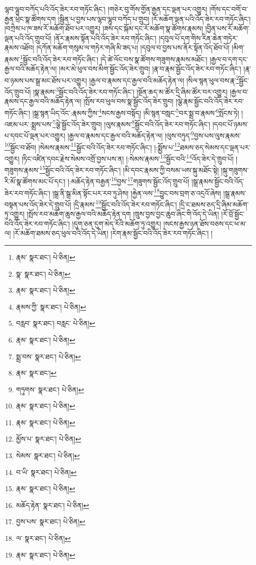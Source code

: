 ལྷབ་ལྷུབ་བཀོད་པའི་འོད་ཟེར་རབ་གཏོང་ཞིང་། །གཅེར་བུ་གོས་གྱོན་རྒྱན་དང་ལྡན་པར་འགྱུར། །གོས་དང་བགོ་བ་རྒྱན་ཕྲེང་སྣ་ཚོགས་དག །སྦྱིན་པ་བྱས་པས་ལྷབ་ལྷུབ་བཀོད་པ་གྲུབ། །རོ་མཆོག་ལྡན་པའི་འོད་ཟེར་རབ་གཏོང་ཞིང་། །བཀྲེས་པ་ཁ་ཟས་རོ་མཆོག་ཐོབ་པར་འགྱུར། །ཟས་དང་སྐོམ་དང་རོ་མཆོག་སྣ་ཚོགས་རྣམས། །བྱིན་པས་རོ་མཆོག་ལྡན་པའི་འོད་གྲུབ་པོ། །ནོར་རྣམས་སྟོན་པའི་འོད་ཟེར་རབ་གཏོང་ཞིང་། །དབུལ་པོ་དག་གིས་རིན་ཆེན་གཏེར་རྣམས་འཐོབ། །དཀོན་མཆོག་གསུམ་ལ་གཏེར་གཞི་མི་ཟད་པ། །དབུལ་བ་བྱས་པས་ནོར་སྟོན་འོད་ཐོབ་པོ། །མིག་རྣམས་\footnote{རྣམ་  སྣར་ཐང་།  པེ་ཅིན། }སྦྱོང་བའི་འོད་ཟེར་རབ་གཏོང་ཞིང་། །དེ་ཚེ་ལོང་བས་སྣ་ཚོགས་གཟུགས་རྣམས་མཐོང་། །རྒྱལ་བ་དག་དང་རྒྱལ་བའི་མཆོད་རྟེན་ལ། །མར་མེ་ཕུལ་བས་མིག་སྦྱོང་འོད་ཟེར་གྲུབ། །རྣ་བ་རྣམ་སྦྱོང་འོད་ཟེར་རབ་གཏོང་ཞིང་། །རྣ་བ་ཉམས་པས་སྒྲ་མང་ཐོས་པར་འགྱུར། །རྒྱལ་བ་རྣམས་དང་རྒྱལ་བའི་མཆོད་རྟེན་ལ། །སིལ་སྙན་ཕུལ་བས་རྣ་\footnote{སྣ་  སྣར་ཐང་།  པེ་ཅིན། }སྦྱོང་འོད་གྲུབ་པོ། །སྣ་རྣམས་\footnote{རྣམ་  སྣར་ཐང་།  པེ་ཅིན། }སྦྱོང་བའི་འོད་ཟེར་རབ་གཏོང་ཞིང་། །སྔོན་ཆད་མ་ཚོར་དྲི་ཞིམ་ཚོར་བར་འགྱུར། །རྒྱལ་བ་རྣམས་དང་རྒྱལ་བའི་མཆོད་རྟེན་ལ། །སྤོས་རབ་ཕུལ་བས་སྣ་སྦྱོང་འོད་ཟེར་གྲུབ། །ལྕེ་རྣམ་སྦྱོང་བའི་འོད་ཟེར་རབ་གཏོང་ཞིང་། །སྒྲ་སྙན་ཡིད་འོང་:རྣམས་ཀྱིས་\footnote{རྣམས་ཀྱི་  སྣར་ཐང་།  པེ་ཅིན། }སངས་རྒྱས་བསྟོད། །མི་སྙན་བསླང་\footnote{བརླབ་  སྣར་ཐང་། བརླང་  པེ་ཅིན། }བར་སྨྲ་བ་རྣམས་\footnote{རྣམ་  སྣར་ཐང་།  པེ་ཅིན། }སྤོངས་ཏེ། །འཇམ་པར་:སྨྲས་པས་\footnote{སྨྲ་བས་  སྣར་ཐང་།  པེ་ཅིན། }ལྕེ་སྦྱོང་འོད་ཟེར་གྲུབ། །ལུས་རྣམས་\footnote{རྣམ་  སྣར་ཐང་། }སྦྱོང་བའི་འོད་ཟེར་རབ་གཏོང་ཞིང་། །དབང་པོ་ཉམས་པ་དབང་པོ་ལྡན་པར་འགྱུར། །རྒྱལ་བ་རྣམས་དང་རྒྱལ་བའི་མཆོད་རྟེན་ལ། །ལུས་བཏུད་\footnote{གཏུགས་  སྣར་ཐང་།  པེ་ཅིན། }བྱས་པས་ལུས་རྣམས་\footnote{རྣམ་  སྣར་ཐང་།  པེ་ཅིན། }སྦྱོང་བ་ཐོབ། །སེམས་རྣམས་\footnote{རྣམ་  སྣར་ཐང་།  པེ་ཅིན། }སྦྱོང་བའི་འོད་ཟེར་རབ་གཏོང་ཞིང་། །:སྨྱོས་པ་\footnote{མྱོས་པ་  སྣར་ཐང་།  པེ་ཅིན། }ཐམས་ཅད་སེམས་དང་ལྡན་པར་འགྱུར། །ཏིང་འཛིན་དབང་རྗེས་སེམས་འགྲོ་བྱས་པས་ན། །:སེམས་རྣམས་\footnote{སེམས་  སྣར་ཐང་།  པེ་ཅིན། }སྦྱོང་བའི་\footnote{བ་ཡི་  སྣར་ཐང་།  པེ་ཅིན། }འོད་ཟེར་དེ་གྲུབ་པོ། །གཟུགས་རྣམས་\footnote{རྣམ་  སྣར་ཐང་།  པེ་ཅིན། }སྦྱོང་བའི་འོད་ཟེར་རབ་གཏོང་ཞིང་། །མི་དབང་རྣམས་ཀྱི་བསམ་ཡས་སྐུ་མཐོང་སྟེ། །སྐུ་གཟུགས་རི་མོ་སྣ་ཚོགས་མང་པོ་དང་། །:མཆོད་རྟེན་བརྒྱན་\footnote{མཆོད་རྟེན་  སྣར་ཐང་།  པེ་ཅིན། }བྱས་\footnote{བྱས་པས་  སྣར་ཐང་།  པེ་ཅིན། }གཟུགས་སྦྱོང་འོད་གྲུབ་པོ། །སྒྲ་རྣམས་སྦྱོང་བའི་འོད་ཟེར་རབ་གཏོང་ཞིང་། །སྒྲ་ནི་སྒྲ་མིན་སྟོང་པར་རབ་ཏུ་ཤེས། །རྐྱེན་ལས་\footnote{ལ་  སྣར་ཐང་།  པེ་ཅིན། }བྱུང་བས་བྲག་ཅ་འདྲའོ་ཞེས། །སྒྲ་རྣམས་བསྟན་པས་འོད་ཟེར་དེ་གྲུབ་པོ། །དྲི་རྣམས་\footnote{རྣམ་  སྣར་ཐང་།  པེ་ཅིན། }སྦྱོང་བའི་འོད་ཟེར་རབ་གཏོང་ཞིང་། །དྲི་ང་ཐམས་ཅད་དྲི་ཞིམ་མཆོག་ཏུ་འགྱུར། །སྤོས་རབ་མཆོག་ཆུས་རྒྱལ་བའི་མཆོད་རྟེན་དག །ཁྲུས་བྱས་བྱང་ཆུབ་ཞིང་གི་འོད་དེ་ཡིན། །རོ་བྲོ་སྦྱོང་བའི་འོད་ཟེར་རབ་གཏོང་ཞིང་། །དུག་ཅན་དུག་མེད་རོའི་མཆོག་ཏུ་འགྱུར། །སངས་རྒྱས་ཉན་ཐོས་བཅས་དང་ཕ་མ་ལ། །རོ་མཆོག་ཐམས་ཅད་ཕུལ་བའི་འོད་དེ་ཡིན། །རེག་རྣམ་སྦྱོང་བའི་འོད་ཟེར་རབ་གཏོང་ཞིང་། །
